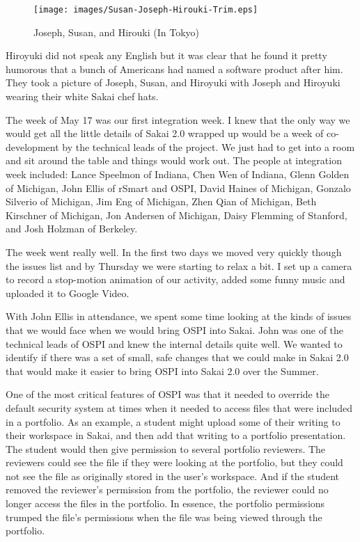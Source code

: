 \documentclass[12pt]{book}
\begin{document}
\begin{figure}[ht!]
\centering
\texttt{[image: images/Susan-Joseph-Hirouki-Trim.eps]}
\caption*{Joseph, Susan, and Hirouki (In Tokyo)}
\label{overflow}
\end{figure}

Hiroyuki did not speak any English but it was clear that
he found it pretty humorous that a bunch of Americans had
named a software product after him.
They took a picture of Joseph, Susan, and Hiroyuki with Joseph and
Hiroyuki wearing their white Sakai chef hats.

The week of May 17 was our first integration week.  I knew that
the only way we would get all the little details of Sakai 2.0
wrapped up would be a week of co-development by the technical
leads of the project.  We just had to get into a room and
sit around the table and things would work out.  The people
at integration week included: Lance Speelmon of Indiana,
Chen Wen of Indiana, Glenn Golden of Michigan,
John Ellis of rSmart and OSPI,
David Haines of Michigan,
Gonzalo Silverio of Michigan,
Jim Eng of Michigan,
Zhen Qian of Michigan,
Beth Kirschner of Michigan,
Jon Andersen of Michigan, Daisy Flemming of Stanford, and
Josh Holzman of Berkeley.

The week went really well.  In the first two days we moved very
quickly though the issues list and by Thursday we were starting
to relax a bit.  I set up a camera to record a stop-motion
animation of our activity, added some funny music and uploaded
it to Google Video.

With John Ellis in attendance, we spent some time looking at the
kinds of issues that we would face when we would bring OSPI
into Sakai.  John was one of the technical leads of OSPI and
knew the internal details quite well.  We wanted to identify
if there was a set of small, safe changes that we could make
in Sakai 2.0 that would make it easier to bring OSPI into Sakai
2.0 over the Summer.

One of the most critical features of OSPI was that it needed
to override the default security system at times when it needed
to access files that were included in a portfolio.  As an
example, a student might upload some of their writing to
their workspace in Sakai, and then add that writing to
a portfolio presentation.  The student would then give permission
to several portfolio reviewers.  The reviewers could see
the file if they were looking at the portfolio, but they
could not see the file as originally stored in the user's
workspace.  And if the student removed the reviewer's
permission from the portfolio, the reviewer could no longer
access the files in the portfolio.  In essence, the portfolio
permissions trumped the file's permissions when the
file was being viewed through the portfolio.
\end{document}
